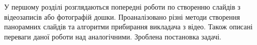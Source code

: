 У першому розділі розглядаються попередні роботи
по створенню слайдів з відеозаписів або фотографій дошки.
Проаналізовано різні методи створення панорамних слайдів
та алгоритми прибирання викладача з відео. Також 
описані переваги даної роботи над аналогічними. 
Зроблена постановка задачі.